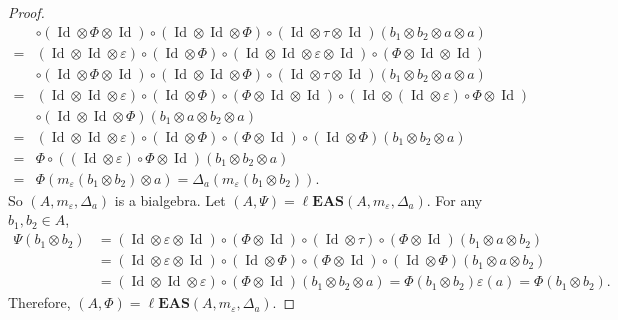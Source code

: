 \documentclass[pdftex]{sigma}
\numberwithin{equation}{section}
\newcommand{\leas}{\ell\mathbf{EAS}}
\begin{document}
\begin{proof}
\begin{align*}
&\circ (\operatorname{Id}\otimes \Phi\otimes \operatorname{Id})\circ(\operatorname{Id} \otimes \operatorname{Id} \otimes \Phi)\circ (\operatorname{Id} \otimes \tau\otimes \operatorname{Id})(b_1\otimes b_2\otimes a\otimes a)\\
={}&(\operatorname{Id} \otimes \operatorname{Id} \otimes \varepsilon)\circ (\operatorname{Id} \otimes \Phi)\circ (\operatorname{Id}\otimes \operatorname{Id} \otimes \varepsilon \otimes \operatorname{Id})\circ (\Phi \otimes \operatorname{Id}\otimes \operatorname{Id})\\
&\circ (\operatorname{Id}\otimes \Phi\otimes \operatorname{Id})\circ(\operatorname{Id} \otimes \operatorname{Id} \otimes \Phi)\circ (\operatorname{Id} \otimes \tau\otimes \operatorname{Id})(b_1\otimes b_2\otimes a\otimes a)\\
={}&(\operatorname{Id} \otimes \operatorname{Id} \otimes \varepsilon)\circ (\operatorname{Id} \otimes \Phi)\circ (\Phi \otimes \operatorname{Id}\otimes \operatorname{Id})\circ (\operatorname{Id}\otimes (\operatorname{Id}\otimes \varepsilon)\circ\Phi\otimes \operatorname{Id})\\
&\circ(\operatorname{Id} \otimes \operatorname{Id} \otimes \Phi)(b_1\otimes a\otimes b_2\otimes a)\\
={}&(\operatorname{Id} \otimes \operatorname{Id} \otimes \varepsilon)\circ (\operatorname{Id} \otimes \Phi)\circ (\Phi \otimes \operatorname{Id})\circ(\operatorname{Id} \otimes \Phi)(b_1\otimes b_2\otimes a)
\\
={}&\Phi\circ((\operatorname{Id} \otimes \varepsilon)\circ \Phi \otimes \operatorname{Id})(b_1\otimes b_2\otimes a)\\
={}&\Phi(m_\varepsilon(b_1\otimes b_2)\otimes a)
=\Delta_a(m_\varepsilon(b_1\otimes b_2)).
\end{align*}
So $(A,m_\varepsilon,\Delta_a)$ is a bialgebra. Let $(A,\Psi)=\leas(A,m_\varepsilon,\Delta_a)$. For any $b_1,b_2\in A$,
\begin{align*}
\Psi(b_1\otimes b_2)&=(\operatorname{Id} \otimes \varepsilon\otimes \operatorname{Id})\circ (\Phi\otimes \operatorname{Id})\circ (\operatorname{Id} \otimes \tau)\circ (\Phi\otimes \operatorname{Id})(b_1\otimes a\otimes b_2)\\
&=(\operatorname{Id} \otimes \varepsilon\otimes \operatorname{Id})\circ (\operatorname{Id}\otimes \Phi)\circ (\Phi \otimes \operatorname{Id})\circ (\operatorname{Id}\otimes \Phi)(b_1\otimes a\otimes b_2)\\
&=(\operatorname{Id} \otimes \operatorname{Id} \otimes \varepsilon)\circ (\Phi\otimes \operatorname{Id})(b_1\otimes b_2\otimes a)=\Phi(b_1\otimes b_2)\varepsilon(a)=\Phi(b_1\otimes b_2).
\end{align*}
Therefore, $(A,\Phi)=\leas(A,m_\varepsilon,\Delta_a)$. \end{proof}
\end{document}
